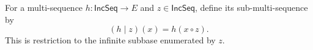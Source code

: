 \begin{definition}
For a multi-sequence $h:\mathsf{IncSeq}\to E$ and $z\in\mathsf{IncSeq}$,
define its sub-multi-sequence by
\[
(h\mathbin{|}z)(x)=h(x\circ z).
\]
This is restriction to the infinite subbase enumerated by $z$.
\end{definition}
